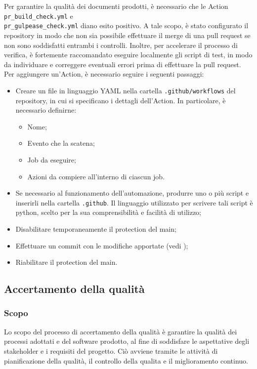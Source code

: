 Per garantire la qualità dei documenti prodotti, è necessario che le Action \texttt{pr\_build\_check.yml}
e \\\texttt{pr\_gulpease\_check.yml} diano esito positivo. A tale scopo, è stato configurato il repository in modo
che non sia possibile effettuare il merge di una pull request se non sono soddisfatti entrambi i controlli.
Inoltre, per accelerare il processo di verifica, è fortemente raccomandato eseguire localmente gli script di test,
in modo da individuare e correggere eventuali errori prima di effettuare la pull request.
Per aggiungere un'Action, è necessario seguire i seguenti passaggi:
\begin{itemize}
      \item Creare un file in linguaggio YAML nella cartella \texttt{.github/workflows} del
            repository, in cui si specificano i dettagli dell'Action. In particolare, è
            necessario definirne:
            \begin{itemize}
                  \item Nome;
                  \item Evento che la scatena;
                  \item Job da eseguire;
                  \item Azioni da compiere all'interno di ciascun job.
            \end{itemize}
      \item Se necessario al funzionamento dell'automazione, produrre uno o più script e
            inserirli nella cartella \texttt{.github}. Il linguaggio utilizzato per
            scrivere tali script è python, scelto per la sua comprensibilità e facilità di
            utilizzo;
      \item Disabilitare temporaneamente il protection del main;
      \item Effettuare un commit con le modifiche apportate (vedi );
      \item Riabilitare il protection del main.
\end{itemize}

\subsection{Accertamento della qualità}
\subsubsection{Scopo}
Lo scopo del processo di accertamento della qualità è garantire la qualità dei
processi adottati e del software prodotto, al fine di soddisfare le aspettative
degli stakeholder e i requisiti del progetto. Ciò avviene tramite le attività
di pianificazione della qualità, il controllo della qualita e il miglioramento
continuo.
